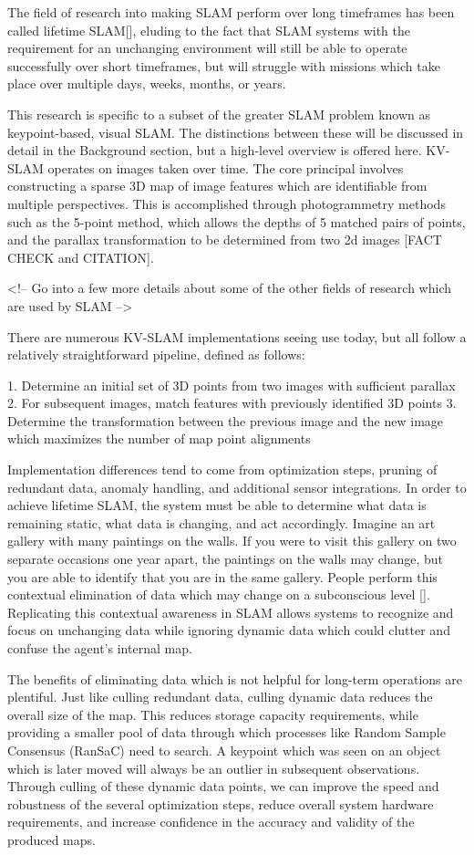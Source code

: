 The field of research into making SLAM perform over long timeframes has been called lifetime SLAM[], eluding to the fact that SLAM systems with the requirement for an unchanging environment will still be able to operate successfully over short timeframes, but will struggle with missions which take place over multiple days, weeks, months, or years.

This research is specific to a subset of the greater SLAM problem known as keypoint-based, visual SLAM. The distinctions between these will be discussed in detail in the Background section, but a high-level overview is offered here. KV-SLAM operates on images taken over time. The core principal involves constructing a sparse 3D map of image features which are identifiable from multiple perspectives. This is accomplished through photogrammetry methods such as the 5-point method, which allows the depths of 5 matched pairs of points, and the parallax transformation to be determined from two 2d images [FACT CHECK and CITATION].

<!-- Go into a few more details about some of the other fields of research which are used by SLAM -->

There are numerous KV-SLAM implementations seeing use today, but all follow a relatively straightforward pipeline, defined as follows:

1. Determine an initial set of 3D points from two images with sufficient parallax
2. For subsequent images, match features with previously identified 3D points
3. Determine the transformation between the previous image and the new image which maximizes the number of map point alignments

Implementation differences tend to come from optimization steps, pruning of redundant data, anomaly handling, and additional sensor integrations. In order to achieve lifetime SLAM, the system must be able to determine what data is remaining static, what data is changing, and act accordingly. Imagine an art gallery with many paintings on the walls. If you were to visit this gallery on two separate occasions one year apart, the paintings on the walls may change, but you are able to identify that you are in the same gallery. People perform this contextual elimination of data which may change on a subconscious level []. Replicating this contextual awareness in SLAM allows systems to recognize and focus on unchanging data while ignoring dynamic data which could clutter and confuse the agent's internal map.

The benefits of eliminating data which is not helpful for long-term operations are plentiful. Just like culling redundant data, culling dynamic data reduces the overall size of the map. This reduces storage capacity requirements, while providing a smaller pool of data through which processes like Random Sample Consensus (RanSaC) need to search. A keypoint which was seen on an object which is later moved will always be an outlier in subsequent observations. Through culling of these dynamic data points, we can improve the speed and robustness of the several optimization steps, reduce overall system hardware requirements, and increase confidence in the accuracy and validity of the produced maps.

